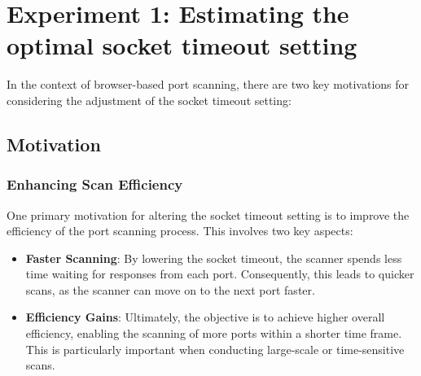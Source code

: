 


\section{Experiment 1: Estimating the optimal socket timeout setting}
\label{section:socket-timeout-setting}

In the context of browser-based port scanning, there are two key motivations for considering the adjustment of the socket timeout setting:
\subsection{Motivation}
\subsubsection{Enhancing Scan Efficiency}

One primary motivation for altering the socket timeout setting is to improve the efficiency of the port scanning process. This involves two key aspects:

\begin{itemize}
  \item \textbf{Faster Scanning}: By lowering the socket timeout, the scanner spends less time waiting for responses from each port. Consequently, this leads to quicker scans, as the scanner can move on to the next port faster.

  \item \textbf{Efficiency Gains}: Ultimately, the objective is to achieve higher overall efficiency, enabling the scanning of more ports within a shorter time frame. This is particularly important when conducting large-scale or time-sensitive scans.
\end{itemize}

